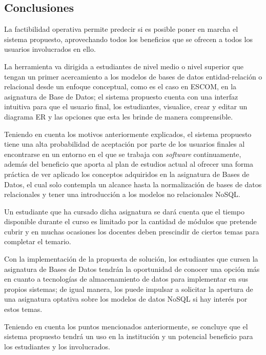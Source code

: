 
\subsection{Conclusiones}


La factibilidad operativa permite predecir si es posible poner en marcha el sistema propuesto, aprovechando todos los beneficios que se ofrecen a todos los usuarios involucrados en ello.


La herramienta va dirigida a estudiantes de nivel medio o nivel superior que tengan un primer acercamiento a los modelos de bases de datos entidad-relación o relacional desde un enfoque conceptual, como es el caso en ESCOM, en la asignatura de Base de Datos; el sistema propuesto cuenta con una interfaz intuitiva para que el usuario final, los estudiantes, visualice, crear y editar un diagrama ER y las opciones que esta les brinde de manera comprensible.


Teniendo en cuenta los motivos anteriormente explicados, el sistema propuesto tiene una alta probabilidad de aceptación por parte de los usuarios finales al encontrarse en un entorno en el que se trabaja con \textit{software} continuamente, además del beneficio que aporta al plan de estudios actual al ofrecer una forma práctica de ver aplicado los conceptos adquiridos en la asignatura de Bases de Datos, el cual solo contempla un alcance hasta la normalización de bases de datos relacionales y tener una introducción a los modelos no relacionales NoSQL.


Un estudiante que ha cursado dicha asignatura se dará cuenta que el tiempo disponible durante el curso es limitado por la cantidad de módulos que pretende cubrir y en muchas ocasiones los docentes deben prescindir de ciertos temas para completar el temario.


Con la implementación de la propuesta de solución, los estudiantes que cursen la asignatura de Bases de Datos tendrán la oportunidad de conocer una opción más en cuanto a tecnologías de almacenamiento de datos para implementar en sus propios sistemas; de igual manera, los puede impulsar a solicitar la apertura de una asignatura optativa sobre los modelos de datos NoSQL si hay interés por estos temas.


Teniendo en cuenta los puntos mencionados anteriormente, se concluye que el sistema propuesto tendrá un uso en la institución y un potencial beneficio para los estudiantes y los involucrados.


